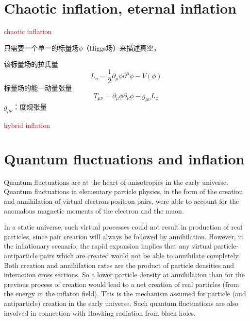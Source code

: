 \documentclass[12pt,a4paper]{article}
\begin{document}
\cite{ryden2016introduction}


\cite{cheng2005relativity}


\section{Chaotic inflation, eternal inflation}

\cite{2010宇宙大尺度结构的形成, 2012宇宙大尺度结构的形成} \textcolor{red}{chaotic inflation}

只需要一个单一的标量场$\phi$（Higgs场）来描述真空，

该标量场的拉氏量
\begin{equation}
L_{\phi} = \frac{1}{2} \partial_\mu \phi \partial^\mu \phi - V(\phi)
\end{equation}
标量场的能—动量张量
\begin{equation}
T_{\mu\nu} = \partial_\mu \phi \partial_\nu \phi -g_{\mu\nu} L_{\phi}
\end{equation}
$g_{\mu\nu}$：度规张量


\textcolor{red}{hybrid inflation}






\section{Quantum fluctuations and inflation}
\cite{perkins2008particle} Quantum fluctuations are at the heart of anisotropies in the early universe. Quantum fluctuations in elementary particle physics, in the form of the creation and annihilation of virtual electron-positron pairs, were able to account for the anomalous magnetic moments of the electron and the muon. 

In a static universe, such virtual processes could not result in production of real particles, since pair creation will always be followed by annihilation. However, in the inflationary scenario, the rapid expansion implies that any virtual particle-antiparticle pairs which are created would not be able to annihilate completely. Both creation and annihilation rates are the product of particle densities and interaction cross sections. So a lower particle density at annihilation than for the previous process of creation would lead to a net creation of real particles (from the energy in the inflaton field). This is the mechanism assumed for particle (and antiparticle) creation in the early universe. Such quantum fluctuations are also involved in connection with Hawking radiation from black holes.
\end{document}
